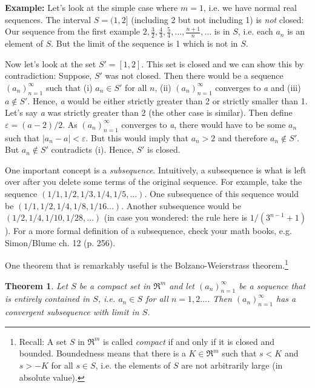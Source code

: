 \documentclass[a4paper,12pt]{article}
\newtheorem{theorem}{Theorem}
\theoremstyle{plain}
\begin{document}
\textbf{Example: }
  Let's look at the simple case where $m=1$, i.e. we have normal real sequences.  The interval $S=(1,2]$ (including 2 but not including 1) is \emph{not} closed: Our sequence from the first example  $2,\frac{3}{2},\frac{4}{3},\frac{5}{4},\dots,\frac{n+1}{n},\dots$ is in $S$, i.e. each $a_n$ is an element of $S$. But the limit of the sequence is 1 which is not in $S$.\par
Now let's look at the set $S'=[1,2]$. This set is closed and we can show this by contradiction: Suppose, $S'$ was not closed. Then there would be a sequence $(a_n)_{n=1}^\infty$ such that (i) $a_n\in S'$ for all $n$, (ii) $(a_n)_{n=1}^\infty$ converges to \emph{a} and (iii) $a\not\in S'$. Hence, \emph{a} would be either strictly greater than 2 or strictly smaller than 1. Let's say \emph{a} was strictly greater than 2 (the other case is similar). Then define $\varepsilon = (a-2)/2$. As $(a_n)_{n=1}^\infty$ converges to \emph{a}, there would have to be some $a_n$ such that $|a_n-a|<\varepsilon $. But this would imply that $a_n>2$ and therefore $a_n\not\in S'$. But $a_n\not\in S'$ contradicts (i). Hence, $S'$ is closed.



One important concept is a \emph{subsequence}. Intuitively, a subsequence is what is left over after you delete some terms of the original sequence. For example, take the sequence $(1/1,1/2,1/3,1/4,1/5,\dots)$. One subsequence of this sequence would be $(1/1,1/2,1/4,1/8,1/16\dots)$. Another subsequence would be $(1/2,1/4,1/10,1/28,\dots)$ (in case you wondered: the rule here is $1/(3^{n-1}+1)$). For a more formal definition of a subsequence, check your math books, e.g. Simon/Blume ch. 12 (p. 256).

One theorem that is remarkably useful is the Bolzano-Weierstrass theorem.\footnote{Recall: A set $S$ in $\Re^m$ is called \emph{compact} if and only if it is closed and bounded. Boundedness means that there is a $K\in\Re^m$ such that $s<K$ and $s>-K$ for all $s\in S$, i.e. the elements of $S$ are not arbitrarily large (in absolute value).}
\begin{theorem}
  Let $S$ be a compact set in $\Re^m$ and let $(a_n)_{n=1}^\infty$ be a sequence that is entirely contained in $S$, i.e. $a_n\in S$ for all $n=1,2\dots$. Then $(a_n)_{n=1}^\infty$ has a convergent subsequence with limit in $S$.
\end{theorem}
\end{document}
